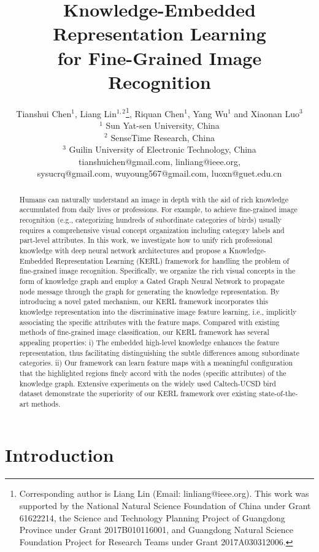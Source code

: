 \documentclass{article}
\title{Knowledge-Embedded Representation Learning \\ for Fine-Grained Image Recognition}
\author{
Tianshui Chen$^1$, 
Liang Lin$^{1,2}$\thanks{\footnotesize Corresponding author is Liang Lin (Email: linliang@ieee.org). This work was supported by the National Natural Science Foundation of China under Grant  61622214, the Science and Technology Planning Project of Guangdong Province under Grant 2017B010116001, and Guangdong Natural Science Foundation Project for Research Teams under Grant 2017A030312006.}, 
Riquan Chen$^1$, 
Yang Wu$^1$
{\normalfont and}  Xiaonan Luo$^3$
\\ 
$^1$ Sun Yat-sen University, China \\
$^2$ SenseTime Research, China\\
$^3$ Guilin University of Electronic Technology, China  \\
tianshuichen@gmail.com,
linliang@ieee.org,\\
sysucrq@gmail.com,
wuyoung567@gmail.com,
luoxn@guet.edu.cn
}
\begin{document}
\maketitle

\begin{abstract}
Humans can naturally understand an image in depth with the aid of rich knowledge accumulated from daily lives or professions. For example, to achieve fine-grained image recognition (e.g., categorizing hundreds of subordinate categories of birds) usually requires a comprehensive visual concept organization including category labels and part-level attributes. In this work, we investigate how to unify rich professional knowledge with deep neural network architectures and propose a Knowledge-Embedded Representation Learning (KERL) framework for handling the problem of fine-grained image recognition. Specifically, we organize the rich visual concepts in the form of knowledge graph and employ a Gated Graph Neural Network to propagate node message through the graph for generating the knowledge representation. By introducing a novel gated mechanism, our KERL framework incorporates this knowledge representation into the discriminative image feature learning, i.e., implicitly associating the specific attributes with the feature maps. Compared with existing methods of fine-grained image classification, our KERL framework has several appealing properties: i) The embedded high-level knowledge enhances the feature representation, thus facilitating distinguishing the subtle differences among subordinate categories. ii) Our framework can learn feature maps with a meaningful configuration that the highlighted regions finely accord with the nodes (specific attributes) of the knowledge graph. Extensive experiments on the widely used Caltech-UCSD bird dataset demonstrate the superiority of our KERL framework over existing state-of-the-art methods.
\end{abstract}

\section{Introduction}
\end{document}
